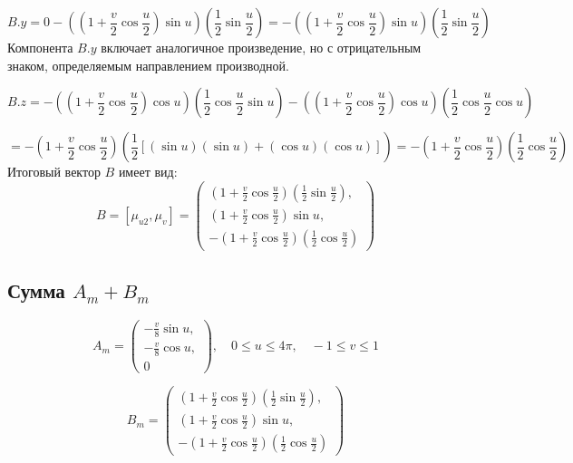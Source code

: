 \documentclass{article}
\begin{document}
        \[
        B.y = 0 - \left( \left( 1 + \frac{v}{2} \cos{\frac{u}{2}} \right) \sin{u} \right) 
        \left( \frac{1}{2} \sin{\frac{u}{2}} \right) = 
        -\left( \left( 1 + \frac{v}{2} \cos{\frac{u}{2}} \right) \sin{u} \right) 
        \left( \frac{1}{2} \sin{\frac{u}{2}} \right)
        \]
        Компонента $B.y$ включает аналогичное произведение, но с отрицательным знаком, определяемым направлением производной.
        
        \[
        B.z = -\left( \left( 1 + \frac{v}{2} \cos{\frac{u}{2}} \right) \cos{u} \right) 
        \left( \frac{1}{2} \cos{\frac{u}{2}} \sin{u} \right) - 
        \left( \left( 1 + \frac{v}{2} \cos{\frac{u}{2}} \right) \cos{u} \right) 
        \left( \frac{1}{2} \cos{\frac{u}{2}} \cos{u} \right)
        \]
        
        \[
        = -\left( 1 + \frac{v}{2} \cos{\frac{u}{2}} \right) 
        \left( \frac{1}{2} \left[ (\sin{u})(\sin{u}) + (\cos{u})(\cos{u}) \right] \right) = 
        -\left( 1 + \frac{v}{2} \cos{\frac{u}{2}} \right) 
        \left( \frac{1}{2} \cos{\frac{u}{2}} \right)
        \]
        Итоговый вектор $B$ имеет вид:
        \[
        B = [\mu_{u2}, \mu_v] = \begin{pmatrix}
        \left( 1 + \frac{v}{2} \cos{\frac{u}{2}} \right) \left( \frac{1}{2} \sin{\frac{u}{2}} \right), \\
        \left( 1 + \frac{v}{2} \cos{\frac{u}{2}} \right) \sin{u}, \\
        -\left( 1 + \frac{v}{2} \cos{\frac{u}{2}} \right) \left( \frac{1}{2} \cos{\frac{u}{2}} \right)
        \end{pmatrix}
        \]
        
        \subsection*{Сумма $A_m + B_m$}
        
        \[
        A_m = \begin{pmatrix}
        -\frac{v}{8} \sin{u}, \\
        -\frac{v}{8} \cos{u}, \\
        0
        \end{pmatrix}, \quad 0 \leq u \leq 4\pi, \quad -1 \leq v \leq 1
        \]
        
        \[
        B_m = \begin{pmatrix}
        \left( 1 + \frac{v}{2} \cos{\frac{u}{2}} \right) \left( \frac{1}{2} \sin{\frac{u}{2}} \right), \\
        \left( 1 + \frac{v}{2} \cos{\frac{u}{2}} \right) \sin{u}, \\
        -\left( 1 + \frac{v}{2} \cos{\frac{u}{2}} \right) \left( \frac{1}{2} \cos{\frac{u}{2}} \right)
        \end{pmatrix}
        \]
        
\end{document}
